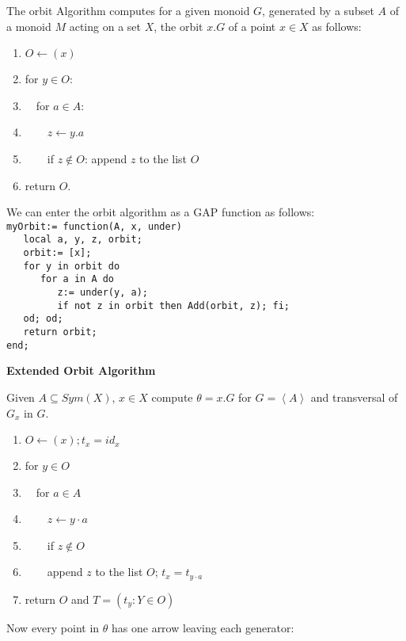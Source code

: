 \documentclass[12pt]{amsart}
\theoremstyle{definition}
\begin{document}
The orbit Algorithm computes for a given monoid $G$, generated by a subset $A$ of a monoid $M$ acting on a set $X$, the orbit $x.G$ of a point $x\in X$ as follows:\\
\begin{enumerate}
\item $O\leftarrow (x)$
\item for $y\in O$:
\item \ \ for $a\in A$:
\item \ \ \ \ $z\leftarrow y.a$
\item \ \ \ \ if $z\not\in O$: append $z$ to the list $O$
\item return $O$.
\end{enumerate}
We can enter the orbit algorithm as a GAP function as follows:\\
\verb"myOrbit:= function(A, x, under)"\\
\verb"   local a, y, z, orbit;"\\
\verb"   orbit:= [x];"\\
\verb"   for y in orbit do"\\
\verb"      for a in A do"\\
\verb"         z:= under(y, a);"\\
\verb"         if not z in orbit then Add(orbit, z); fi;"\\
\verb"   od; od;"\\
\verb"   return orbit;"\\
\verb"end;"

\begin{center}
\textbf{Extended Orbit Algorithm}
\end{center}

Given $A \subseteq Sym(X)$, $x \in X$ compute $\theta = x.G$ for $G = \left\langle A \right\rangle$ and transversal of $G_{x}$ in $G$.
\begin{enumerate}
\item $O \leftarrow (x); t_{x} = id_{x}$
\item for $y \in O$
\item \ \ for $a \in A$
\item \ \ \ \ $z \leftarrow y \cdot a$
\item \ \ \ \ if $z \not\in O$
\item \ \ \ \ append $z$ to the list $O$; $t_{x} = t_{y \cdot a}$
\item return $O$ and $T = \left( t_{y} : Y \in O \right)$
\end{enumerate}

Now every point in $\theta$ has one arrow leaving each generator:
\end{document}
